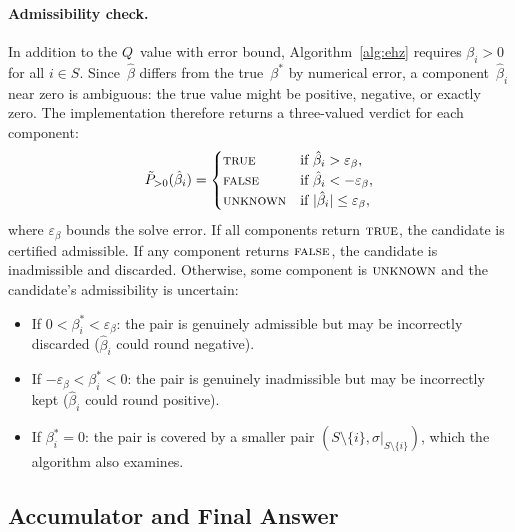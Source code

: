 
\paragraph{Admissibility check.}
In addition to the $Q$~value with error bound,
Algorithm~\ref{alg:ehz} requires
$\beta_i > 0$ for all $i \in S$.
Since~$\hat\beta$ differs from the true~$\beta^*$ by
numerical error, a component~$\hat\beta_i$ near zero is
ambiguous: the true value might be positive, negative,
or exactly zero.
The implementation therefore returns a three-valued verdict
for each component:
\[
  \tilde P_{>0}(\hat\beta_i) =
  \begin{cases}
    \textsc{true}
      & \text{if } \hat\beta_i > \varepsilon_\beta, \\
    \textsc{false}
      & \text{if } \hat\beta_i < -\varepsilon_\beta, \\
    \textsc{unknown}
      & \text{if } |\hat\beta_i| \leq \varepsilon_\beta,
  \end{cases}
\]
where $\varepsilon_\beta$ bounds the solve error.
If all components return $\textsc{true}$, the candidate
is certified admissible.
If any component returns $\textsc{false}$, the candidate
is inadmissible and discarded.
Otherwise, some component is $\textsc{unknown}$ and
the candidate's admissibility is uncertain:
\begin{itemize}
\item If $0 < \beta^*_i < \varepsilon_\beta$:
  the pair is genuinely admissible but may be incorrectly
  discarded ($\hat\beta_i$ could round negative).
\item If $-\varepsilon_\beta < \beta^*_i < 0$:
  the pair is genuinely inadmissible but may be incorrectly
  kept ($\hat\beta_i$ could round positive).
\item If $\beta^*_i = 0$:
  the pair is covered by a smaller
  pair $(S \setminus \{i\}, \sigma|_{S \setminus \{i\}})$,
  which the algorithm also examines.
\end{itemize}



\subsection{Accumulator and Final Answer}\label{app:v2-answer}

